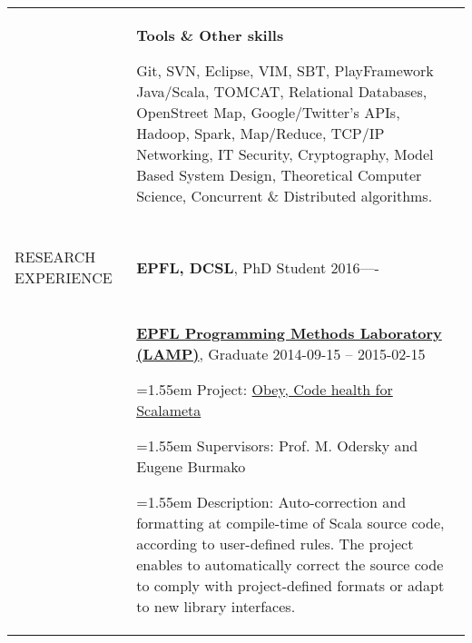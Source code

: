 \documentclass[a4paper,10pt,oneside]{article}
\newcommand{\BulletSymbol}{{\char"2022}}
\newcommand{\LongMonth}[1]{%
\ifcase#1\relax
\or January%
\or February%
\or March%
\or April%
\or May%
\or June%
\or July%
\or August%
\or September%
\or October%
\or November%
\or December%
\fi}
\newcommand{\ShortMonth}[1]{%
\ifcase#1\relax
\or Jan%
\or Feb%
\or Mar%
\or Apr%
\or May%
\or Jun%
\or Jul%
\or Aug%
\or Sep%
\or Oct%
\or Nov%
\or Dec%
\fi}
\newcommand{\DatestampYMD}[3]{\mbox{#1-#2-#3}}
\newcommand{\DatestampYMD}[3]{\mbox{\ShortMonth{#2} #1}}
\newcommand{\DatestampYMD}[3]{\mbox{\LongMonth{#2} #1}}
\newcommand{\DatestampYMD}[3]{#1}
\newenvironment{body}
{\par\vspace{-1em}\par
\begin{longtable}{p{0.15\textwidth}p{0.80\textwidth}}}
{\par\end{longtable}\par}
\renewcommand{\section}[3]{\\[-1em]\pdfbookmark[2]{#2}{#3}\\%
{\fontsize{9pt}{11pt}\selectfont\bfseries\raggedright%
\MakeUppercase{#1}}&}
\newcommand{\EntryGap}{\\[-0.5em]~&}
\newenvironment{detail}
{\par\begingroup\fontsize{8.6}{10.3}\selectfont}
{\par\endgroup\par}
\newenvironment{skilling}
{\par\begingroup\fontsize{8.6}{10.3}\selectfont}
{\par\endgroup\par}
\newcommand{\BulletItem}{\par%
\noindent\hangafter=1\hangindent=1.55em\ignorespaces%
\hspace{0.8em}\BulletSymbol\hspace{0.4em}\ignorespaces}
\begin{document}
\begin{body}
\EntryGap
\textbf{Tools \& Other skills}
\par
\begin{skilling}
Git, SVN, Eclipse, VIM, SBT, PlayFramework Java/Scala, TOMCAT,
Relational Databases, OpenStreet Map, Google/Twitter's APIs, Hadoop, Spark, Map/Reduce,
TCP/IP Networking, IT Security, Cryptography, Model Based System Design, Theoretical Computer Science,
Concurrent \& Distributed algorithms.
\end{skilling}

\hline

\section
{Research Experience}
{Research Experience}
{PDF:ResearchExperience}

{\textbf{EPFL, DCSL}},
PhD Student
\hfill
\DatestampYMD{2016} --
\DatestampYMD{Present}
\begin{detail}
\BulletItem
Project:
Light-weight contexts in Dune
\BulletItem
Supervisors:
Prof Edouard Bugnion
\BulletItem
Research areas:
Light-weight contexts allowing processes to create and switch among different address spaces in a virtualized environment (intel VTX).
\end{detail}

\href{http://http://www.ccs.neu.edu/research/prl/}
{\textbf{Northeastern University, Boston}},
Master Thesis Student
\hfill
\DatestampYMD{2015}{09}{15} --
\DatestampYMD{2016}{03}{15}
\begin{detail}
\BulletItem
Project:
Efficient runtime deoptimization for R 
\BulletItem
Supervisors:
Prof Jan Vitek and
Prof Viktor Kuncak
\BulletItem
Research areas:
On-stack replacement, assumption-based compiler optimizations, R, LLVM, JIT compilers
\end{detail}

\href{http://www.abb.com/}
{\textbf{ABB Corporate Research}},
Graduate Research Intern
\hfill
\DatestampYMD{2015}{02}{15} --
\DatestampYMD{2015}{08}{15}
\begin{detail}
\BulletItem
Project:
Aperiodic Support in FASA
\BulletItem
Supervisors:
Dr. Manuel Oriol and
Dr. Aurelien Monot
\BulletItem
Research areas:
Fixed-priority servers, data-driven events, real-time control applications, Kernel, dynamic linking/loading, $\pi$-calculus 
\end{detail}

\EntryGap
\href{http://lamp.epfl.ch/}
{\textbf{EPFL Programming Methods Laboratory (LAMP)}},
Graduate
\hfill
\DatestampYMD{2014}{09}{15} --
\DatestampYMD{2015}{02}{15}
\begin{detail}
\BulletItem
Project:
\href{http://infoscience.epfl.ch/record/204804?ln=en}
{Obey, Code health for Scalameta}
\BulletItem
Supervisors:
Prof. M. Odersky and 
Eugene Burmako
\BulletItem
Description:
Auto-correction and formatting at compile-time of Scala source code, according to user-defined rules.
The project enables to automatically correct the source code to comply with project-defined formats or adapt to new library interfaces.
\end{detail}


\end{body}
\end{document}
